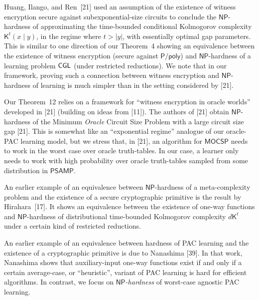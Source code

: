 \documentclass[10pt,a4paper]{article}
\begin{document}
Huang, Ilango, and Ren [21] used an assumption of the existence of witness encryption secure against subexponential-size circuits to conclude the ${\mathsf{NP}}$-hardness of approximating the time-bounded conditional Kolmogorov complexity ${\mathsf{K}}^{t}(x\mid y)$, in the regime where $t>|y|$, with essentially optimal gap parameters. This is similar to one direction of our Theorem 4 showing an equivalence between the existence of witness encryption (secure against ${\mathsf{P}}/{\mathsf{poly}}$) and ${\mathsf{NP}}$-hardness of a learning problem ${\sf CGL}$ (under restricted reductions). We note that in our framework, proving such a connection between witness encryption and ${\mathsf{NP}}$-hardness of learning is much simpler than in the setting considered by [21].\par




Our Theorem 12 relies on a framework for “witness encryption in oracle worlds” developed in [21] (building on ideas from [11]). The authors of [21] obtain ${\mathsf{NP}}$-hardness of the Minimum \emph{Oracle} Circuit Size Problem with a large circuit size gap [21]. This is somewhat like an “exponential regime” analogue of our oracle-PAC learning model, but we stress that, in [21], an algorithm for ${\mathsf{MOCSP}}$ needs to work in the worst case over oracle truth-tables. In our case, a learner only needs to work with high probability over oracle truth-tables sampled from some distribution in ${\mathsf{P}}{\mathsf{SAMP}}$.\par




An earlier example of an equivalence between ${\mathsf{NP}}$-hardness of a meta-complexity problem and the existence of a secure cryptographic primitive is the result by
Hirahara [17]. It shows an equivalence between the existence of one-way functions and ${\mathsf{NP}}$-hardness of distributional time-bounded Kolmogorov complexity $d{\mathsf{K}}^{t}$ under a certain kind of restricted reductions.\par




An earlier example of an equivalence between hardness of PAC learning and the existence of a cryptographic primitive is due to Nanashima [39]. In that work, Nanashima shows that auxiliary-input one-way functions exist if and only if a certain average-case, or “heuristic”, variant of PAC learning is hard for efficient algorithms. In contrast, we focus on \emph{${\mathsf{NP}}$-hardness} of worst-case agnostic PAC learning.\par
\end{document}
